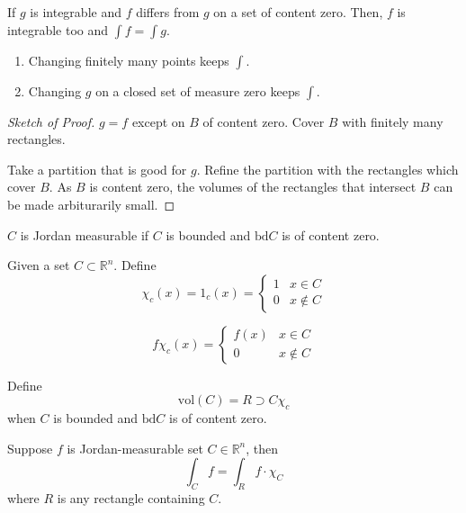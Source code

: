 \documentclass[a4paper]{article}
\numberwithin{equation}{section}
\newcommand{\R}{\mathbb{R}}
\newcommand{\vol}{\mathrm{vol}}
\begin{document}
\begin{corollary}
    If $g$ is integrable and $f$ differs from $g$ on a set of content zero. Then, $f$ is integrable too and $\int f=\int g$.
    \begin{enumerate}
        \item Changing finitely many points keeps $\int$.
        \item Changing $g$ on a closed set of measure zero keeps $\int$.
    \end{enumerate}

    \begin{proof}[Sketch of Proof]
        $g=f$ except on $B$ of content zero. Cover $B$ with finitely many rectangles.

        Take a partition that is good for $g$. Refine the partition with the rectangles which cover $B$. As $B$ is content zero, the volumes of the rectangles that intersect $B$ can be made arbiturarily small.
    \end{proof}
\end{corollary}
\begin{definition}
    $C$ is Jordan measurable if $C$ is bounded and $\textrm{bd}C$ is of content zero.
\end{definition}
\begin{definition}
    Given a set $C\subset\R^n$. Define 
    \begin{equation}
        \chi_c(x)=1_c(x)=\begin{cases}
            1 & x\in C\\
            0 & x\notin C
        \end{cases}
    \end{equation}

    \begin{equation}
        f\chi_c(x)=\begin{cases}
            f(x) & x\in C\\
            0 & x\notin C
        \end{cases}
    \end{equation}

    Define \begin{equation}
        \vol(C)={R\supset C}\chi_c
    \end{equation}
    when $C$ is bounded and $\textrm{bd}C$ is of content zero.

    Suppose $f$ is Jordan-measurable set $C\in\R^n$, then 
    \begin{equation}
        \int_Cf=\int_Rf\cdot\chi_C
    \end{equation} 
    where $R$ is any rectangle containing $C$.
\end{definition}
\end{document}

